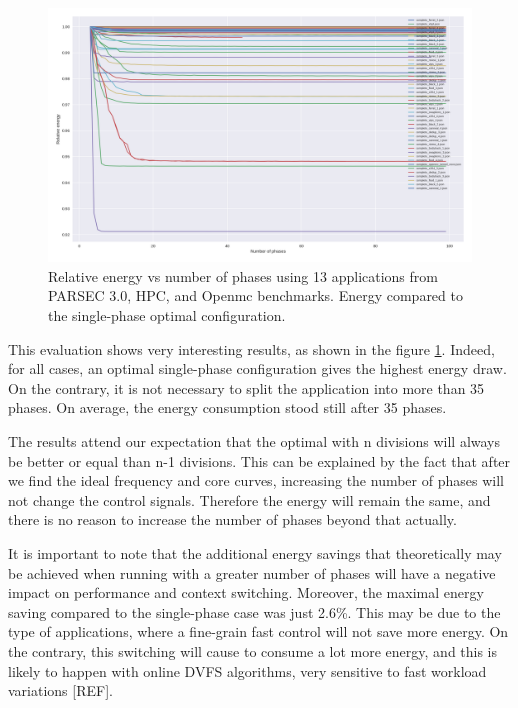 \begin{figure}[H]
\includegraphics[width=\columnwidth]{fingerprint/figures/energy_per_phase.png}
    \caption{Relative energy vs number of phases using 13 applications from PARSEC 3.0, HPC, and Openmc benchmarks. Energy compared to the single-phase optimal configuration.}
    \label{fig:relative_energy}
\end{figure}

This evaluation shows very interesting results, as shown in the figure \ref{fig:relative_energy}. Indeed, for all cases, an optimal single-phase configuration gives the highest energy draw. On the contrary, it is not necessary to split the application into more than 35 phases. On average, the energy consumption stood still after 35 phases. 

The results attend our expectation that the optimal with n divisions will always be better or equal than n-1 divisions. This can be explained by the fact that after we find the ideal frequency and core curves, increasing the number of phases will not change the control signals. Therefore the energy will remain the same, and there is no reason to increase the number of phases beyond that actually. 

It is important to note that the additional energy savings that theoretically may be achieved when running with a greater number of phases will have a negative impact on performance and context switching. Moreover, the maximal energy saving compared to the single-phase case was just 2.6\%. This may be due to the type of applications, where a fine-grain fast control will not save more energy. On the contrary, this switching will cause to consume a lot more energy, and this is likely to happen with online DVFS algorithms, very sensitive to fast workload variations [REF].

